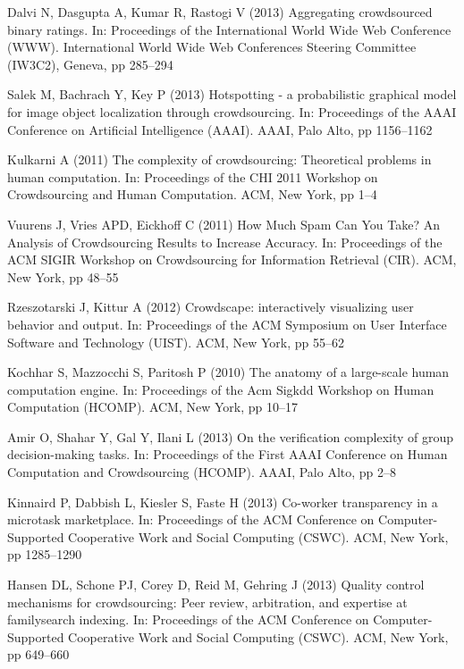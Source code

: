 \documentclass[11pt]{bmc_article_s50}
\begin{document}
\begin{thebibliography}{000}
Dalvi N,
Dasgupta A,
Kumar R,
Rastogi V (2013)
{Aggregating crowdsourced binary ratings}.
In: {Proceedings of the International World Wide Web Conference (WWW)}.
{International World Wide Web Conferences Steering Committee (IW3C2)},
{Geneva},
pp 285--{294}


Salek M,
Bachrach Y,
Key P (2013)
{Hotspotting - a probabilistic graphical model for image object
  localization through crowdsourcing}.
In: {Proceedings of the AAAI Conference on Artificial Intelligence
  (AAAI)}.
{AAAI},
{Palo Alto, }pp 1156--{1162}


Kulkarni A (2011)
{The complexity of crowdsourcing: Theoretical problems in human computation.}
In: {Proceedings of the CHI 2011 Workshop on Crowdsourcing and Human Computation}.
{ACM},
{New York},
pp 1--{4}

Vuurens J,
Vries APD,
Eickhoff C (2011)
{{How Much Spam Can You Take? An Analysis of Crowdsourcing Results to Increase Accuracy}}.
In: {Proceedings of the ACM SIGIR Workshop on Crowdsourcing for Information Retrieval (CIR)}.
{ACM},
{New York}, pp 48--{55}


Rzeszotarski J,
Kittur A (2012)
{Crowdscape: interactively visualizing user behavior and output}.
In: {Proceedings of the ACM Symposium on User Interface Software and
  Technology (UIST)}.
{ACM},
{New York}, pp 55--{62}

Kochhar S,
Mazzocchi S,
Paritosh P (2010)
{The anatomy of a large-scale human computation engine}.
In: {Proceedings of the Acm Sigkdd Workshop on Human Computation
  (HCOMP)}.
{ACM},
{New York},
pp 10--{17}


Amir O,
Shahar Y,
Gal Y,
Ilani L (2013)
{On the verification complexity of group decision-making tasks}.
In: {Proceedings of the First AAAI Conference on Human Computation and
  Crowdsourcing (HCOMP)}.
{AAAI},
{Palo Alto},
pp 2--{8}


Kinnaird P,
Dabbish L,
Kiesler S,
Faste H (2013)
{Co-worker transparency in a microtask marketplace}.
In: {Proceedings of the ACM Conference on Computer-Supported
  Cooperative Work and Social Computing (CSWC)}.
{ACM},
{New York},
pp 1285--{1290}

Hansen DL,
Schone PJ,
Corey D,
Reid M,
Gehring J (2013)
{Quality control mechanisms for crowdsourcing: Peer review,
  arbitration, and expertise at familysearch indexing}.
In: {Proceedings of the ACM Conference on Computer-Supported
  Cooperative Work and Social Computing (CSWC)}.
{ACM},
{New York},
pp 649--{660}



\end{thebibliography}
\end{document}
